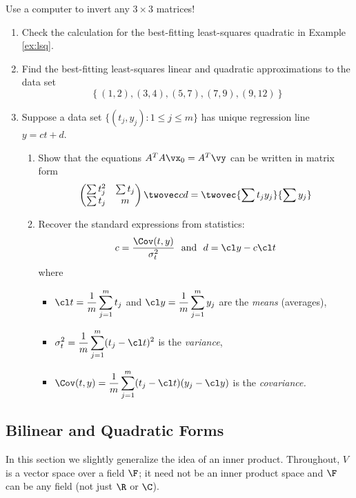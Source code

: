 \begin{tcolorbox}[exercisestyle,title={Optional Problems\quad }]
Use a computer to invert any $3\times 3$ matrices!
\begin{enumerate}
	\item Check the calculation for the best-fitting least-squares quadratic in Example \ref{ex:lsq}.
  
  \item Find the best-fitting least-squares linear and quadratic approximations to the data set
  \[\left\{(1,2),(3,4),(5,7),(7,9),(9,12)\right\}\]
  
  \item Suppose a data set $\{(t_j,y_j):1\le j\le m\}$ has unique regression line $y=ct+d$.
  \begin{enumerate}
    \item Show that the equations $A^TA\vx_0=A^T\vy$ can be written in matrix form
    \[\begin{pmatrix}
    \sum t^2_j&\sum t_j\\
    \sum t_j&m
    \end{pmatrix}\twovec cd =\twovec{\sum t_jy_j}{\sum y_j}\]
    \item Recover the standard expressions from statistics:
    \[c=\frac{\Cov(t,y)}{\sigma^2_t}\ \text{ and }\ d=\cl y-c\cl t\]
    where
    \begin{itemize}
      \item $\displaystyle\cl t=\frac 1m\sum_{j=1}^m t_j$ and $\displaystyle\cl y=\frac 1m\sum_{j=1}^m y_j$ are the \emph{means} (averages),
      \item $\displaystyle\sigma^2_t=\frac 1m\sum_{j=1}^m(t_j-\cl t)^2$ is the \emph{variance},
      \item $\displaystyle\Cov(t,y)=\frac 1m\sum_{j=1}^m(t_j-\cl t)(y_j-\cl y)$ is the \emph{covariance.}
    \end{itemize}
	\end{enumerate}
\end{enumerate}
\end{tcolorbox}

\clearpage

\subsection{Bilinear and Quadratic Forms}

In this section we slightly generalize the idea of an inner product. Throughout, $V$ is a vector space over a field $\F$; it need not be an inner product space and $\F$ can be any field (not just $\R$ or $\C$).

